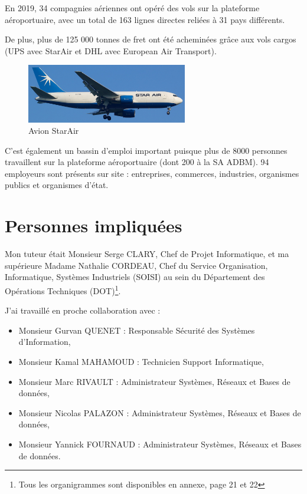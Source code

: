 En 2019, 34 compagnies aériennes ont opéré des vols sur la plateforme aéroportuaire, avec un total de 163 lignes directes reliées à 31 pays différents.

De plus, plus de 125 000 tonnes de fret ont été acheminées grâce aux vols cargos (UPS avec StarAir et DHL avec European Air Transport).

\begin{figure}[hbt!]
  \centering
  \includegraphics[width=7cm]{Images/starair.jpg}
  \caption{Avion StarAir}
  \label{fig:starair}
\end{figure}

C'est également un bassin d'emploi important puisque plus de 8000 personnes travaillent sur la plateforme aéroportuaire (dont 200 à la SA ADBM). 94 employeurs sont présents sur site : entreprises, commerces, industries, organismes publics et organismes d'état.

\newpage

\section{Personnes impliquées}


Mon tuteur était Monsieur Serge CLARY, Chef de Projet Informatique, et ma supérieure Madame Nathalie CORDEAU, Chef du Service Organisation, Informatique, Systèmes Industriels (SOISI) au sein du Département des Opérations Techniques (DOT)\footnote{Tous les organigrammes sont disponibles en annexe, page 21 et 22}.\newline

J'ai travaillé en proche collaboration avec :

\begin{itemize}
    \item Monsieur Gurvan QUENET : Responsable Sécurité des Systèmes d'Information,
    \item Monsieur Kamal MAHAMOUD : Technicien Support Informatique,
    \item Monsieur Marc RIVAULT : Administrateur Systèmes, Réseaux et Bases de données,
    \item Monsieur Nicolas PALAZON : Administrateur Systèmes, Réseaux et Bases de données,
    \item Monsieur Yannick FOURNAUD : Administrateur Systèmes, Réseaux et Bases de données.\newline
\end{itemize}

